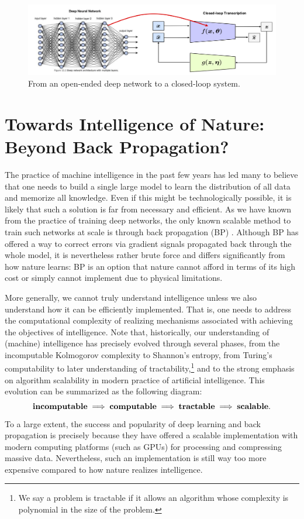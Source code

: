 \documentclass[../../book-main.tex]{subfiles}
\begin{document}
\begin{figure}[t]
    \centering    \includegraphics[width=0.9\linewidth]{chapters/chapter8/figs/open-to-closed.png}
    \caption{From an open-ended deep network to a closed-loop system.}
    \label{fig:open-to-closed}
\end{figure}



\section{Towards Intelligence of Nature: Beyond Back Propagation?}
The practice of machine intelligence in the past few years has led many to believe that one needs to build a single large model to learn the distribution of all data and memorize all knowledge. Even if this might be technologically possible, it is likely that such a solution is far from necessary and efficient. As we have known from the practice of training deep networks, the only known scalable method to train such networks at scale is through back propagation (BP) \cite{Back-Prop}. Although BP has offered a way to correct errors via gradient signals propagated back through the whole model, it is nevertheless rather brute force and differs significantly from how nature learns: BP is an option that nature cannot afford in terms of its high cost or simply cannot implement due to physical limitations. 

More generally, we cannot truly understand intelligence unless we also understand how it can be efficiently implemented. That is, one needs to address the computational complexity of realizing mechanisms associated with achieving the objectives of intelligence. Note that, historically, our understanding of (machine) intelligence has precisely evolved through several phases, from the incomputable Kolmogorov complexity to Shannon's entropy, from Turing's computability to later understanding of  tractability,\footnote{We say a problem is tractable if it allows an algorithm whose complexity is polynomial in the size of the problem.} and to the strong emphasis on algorithm scalability in modern practice of artificial intelligence. This evolution can be summarized as the following diagram:
\begin{equation}
   \mbox{\textbf{incomputable}} \;
   \Longrightarrow \; \mbox{\textbf{computable}} \;
   \Longrightarrow \; \mbox{\textbf{tractable}} \; \Longrightarrow \; 
   \mbox{\textbf{scalable}}.
\end{equation}
To a large extent, the success and popularity of deep learning and back propagation is precisely because they have offered a  scalable implementation with modern computing platforms (such as GPUs) for processing and compressing massive data. Nevertheless, such an implementation is still way too more expensive compared to how nature realizes intelligence. 
\end{document}
